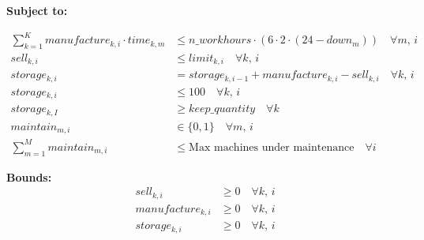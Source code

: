 \documentclass{article}
\begin{document}
\textbf{Subject to:}

\begin{align}
    \sum_{k=1}^{K} manufacture_{k,i} \cdot time_{k,m} &\leq n\_workhours \cdot (6 \cdot 2 \cdot (24 - down_m)) \quad \forall m, \, i \\
    sell_{k, i} &\leq limit_{k, i} \quad \forall k, \, i \\
    storage_{k, i} &= storage_{k, i-1} + manufacture_{k, i} - sell_{k, i} \quad \forall k, \, i \\
    storage_{k, i} &\leq 100 \quad \forall k, \, i \\
    storage_{k, I} &\geq keep\_quantity \quad \forall k \\
    maintain_{m, i} &\in \{0, 1\} \quad \forall m, \, i \\
    \sum_{m=1}^{M} maintain_{m,i} &\leq \text{Max machines under maintenance} \quad \forall i
\end{align}

\textbf{Bounds:}
\begin{align*}
    sell_{k, i} &\geq 0 \quad \forall k, \, i \\
    manufacture_{k, i} &\geq 0 \quad \forall k, \, i \\
    storage_{k, i} &\geq 0 \quad \forall k, \, i \\
\end{align*}
\end{document}
